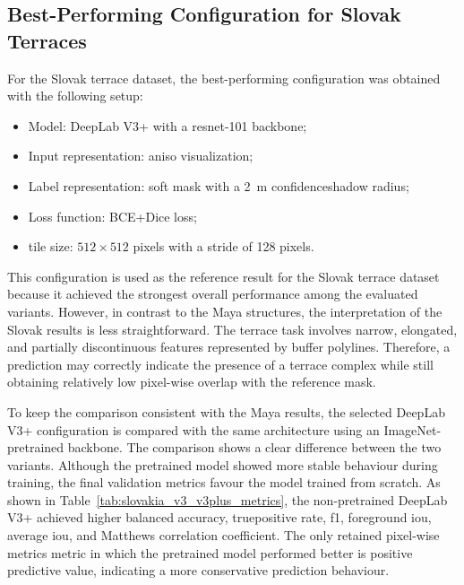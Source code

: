 \subsection{Best-Performing Configuration for Slovak Terraces}

For the Slovak terrace dataset, the best-performing configuration was obtained with the following setup:
\begin{itemize}
    \item Model: DeepLab V3+ with a \gls{resnet}-101 backbone;
    \item Input representation: \gls{aniso} visualization;
    \item Label representation: soft mask with a 2~m \gls{confidenceshadow} radius;
    \item Loss function: BCE+Dice loss;
    \item tile size: $512 \times 512$ pixels with a stride of 128 pixels.
\end{itemize}

This configuration is used as the reference result for the Slovak terrace dataset because it achieved the strongest overall performance among the evaluated variants. However, in contrast to the Maya structures, the interpretation of the Slovak results is less straightforward. The terrace task involves narrow, elongated, and partially discontinuous features represented by \gls{buffer} polylines. Therefore, a prediction may correctly indicate the presence of a terrace complex while still obtaining relatively low pixel-wise overlap with the reference mask.

To keep the comparison consistent with the Maya results, the selected DeepLab V3+ configuration is compared with the same architecture using an ImageNet-pretrained backbone. The comparison shows a clear difference between the two variants. Although the pretrained model showed more stable behaviour during training, the final validation metrics favour the model trained from scratch. As shown in Table~\ref{tab:slovakia_v3_v3plus_metrics}, the non-pretrained DeepLab V3+ achieved higher balanced accuracy, \gls{truepositive} rate, \gls{f1}, foreground \gls{iou}, average \gls{iou}, and Matthews correlation coefficient. The only retained pixel-wise metrics metric in which the pretrained model performed better is positive predictive value, indicating a more conservative prediction behaviour.

